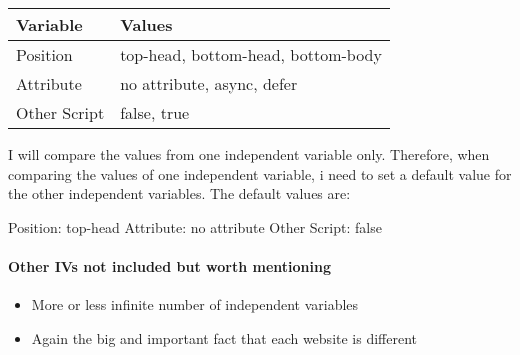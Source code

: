 \begin{table}[]
	\centering
	\begin{tabular}{| l | l | }
	\hline
	Variable & Values \\
	\hline
	Position & top-head, bottom-head, bottom-body \\
	Attribute & no attribute, async, defer \\
	Other Script & false, true \\
	\hline
	\end{tabular}
\end{table}

I will compare the values from one independent variable only.
Therefore, when comparing the values of one independent variable, i need to set a default value for the other independent variables.
The default values are:

Position: top-head
Attribute: no attribute
Other Script: false






\paragraph{Other IVs not included but worth mentioning}

\begin{itemize}
\item More or less infinite number of independent variables
\item Again the big and important fact that each website is different
\end{itemize}
















